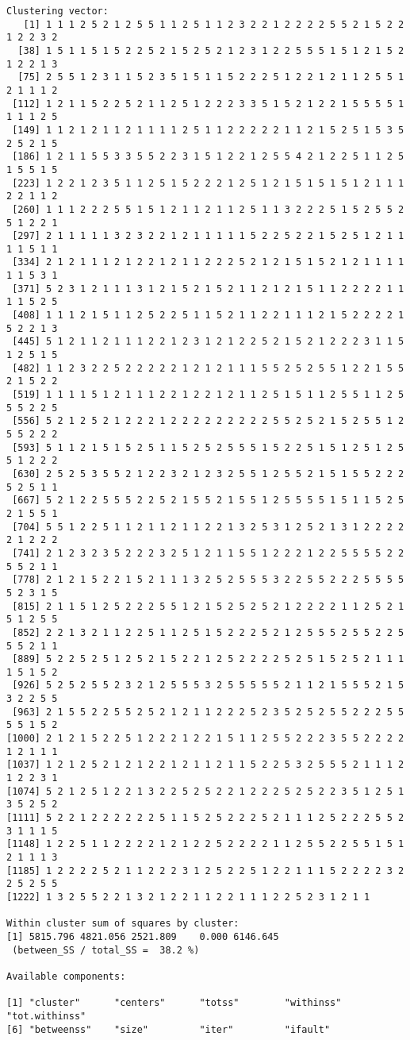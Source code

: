 \documentclass[
  letterpaper,
  DIV=11,
  numbers=noendperiod]{scrartcl}
\begin{document}
\begin{verbatim}
Clustering vector:
   [1] 1 1 1 2 5 2 1 2 5 5 1 1 2 5 1 1 2 3 2 2 1 2 2 2 2 5 5 2 1 5 2 2 1 2 2 3 2
  [38] 1 5 1 1 5 1 5 2 2 5 2 1 5 2 5 2 1 2 3 1 2 2 5 5 5 1 5 1 2 1 5 2 1 2 2 1 3
  [75] 2 5 5 1 2 3 1 1 5 2 3 5 1 5 1 1 5 2 2 2 5 1 2 2 1 2 1 1 2 5 5 1 2 1 1 1 2
 [112] 1 2 1 1 5 2 2 5 2 1 1 2 5 1 2 2 2 3 3 5 1 5 2 1 2 2 1 5 5 5 5 1 1 1 1 2 5
 [149] 1 1 2 1 2 1 1 2 1 1 1 1 2 5 1 1 2 2 2 2 2 1 1 2 1 5 2 5 1 5 3 5 2 5 2 1 5
 [186] 1 2 1 1 5 5 3 3 5 5 2 2 3 1 5 1 2 2 1 2 5 5 4 2 1 2 2 5 1 1 2 5 1 5 5 1 5
 [223] 1 2 2 1 2 3 5 1 1 2 5 1 5 2 2 2 1 2 5 1 2 1 5 1 5 1 5 1 2 1 1 1 2 2 1 1 2
 [260] 1 1 1 2 2 2 5 5 1 5 1 2 1 1 2 1 1 2 5 1 1 3 2 2 2 5 1 5 2 5 5 2 5 1 2 2 1
 [297] 2 1 1 1 1 1 3 2 3 2 2 1 2 1 1 1 1 1 5 2 2 5 2 2 1 5 2 5 1 2 1 1 1 1 5 1 1
 [334] 2 1 2 1 1 1 2 1 2 2 1 2 1 1 2 2 2 5 2 1 2 1 5 1 5 2 1 2 1 1 1 1 1 1 5 3 1
 [371] 5 2 3 1 2 1 1 1 3 1 2 1 5 2 1 5 2 1 1 2 1 2 1 5 1 1 2 2 2 2 1 1 1 1 5 2 5
 [408] 1 1 1 2 1 5 1 1 2 5 2 2 5 1 1 5 2 1 1 2 2 1 1 1 2 1 5 2 2 2 2 1 5 2 2 1 3
 [445] 5 1 2 1 1 2 1 1 1 2 2 1 2 3 1 2 1 2 2 5 2 1 5 2 1 2 2 2 3 1 1 5 1 2 5 1 5
 [482] 1 1 2 3 2 2 5 2 2 2 2 2 1 2 1 2 1 1 1 5 5 2 5 2 5 5 1 2 2 1 5 5 2 1 5 2 2
 [519] 1 1 1 1 5 1 2 1 1 1 2 2 1 2 2 1 2 1 1 2 5 1 5 1 1 2 5 5 1 1 2 5 5 5 2 2 5
 [556] 5 2 1 2 5 2 1 2 2 2 1 2 2 2 2 2 2 2 2 2 5 5 2 5 2 1 5 2 5 5 1 2 5 5 2 2 2
 [593] 5 1 1 2 1 5 1 5 2 5 1 1 5 2 5 2 5 5 5 1 5 2 2 5 1 5 1 2 5 1 2 5 5 1 2 2 2
 [630] 2 5 2 5 3 5 5 2 1 2 2 3 2 1 2 3 2 5 5 1 2 5 5 2 1 5 1 5 5 2 2 2 5 2 5 1 1
 [667] 5 2 1 2 2 5 5 5 2 2 5 2 1 5 5 2 1 5 5 1 2 5 5 5 5 1 5 1 1 5 2 5 2 1 5 5 1
 [704] 5 5 1 2 2 5 1 1 2 1 1 2 1 1 2 2 1 3 2 5 3 1 2 5 2 1 3 1 2 2 2 2 2 1 2 2 2
 [741] 2 1 2 3 2 3 5 2 2 2 3 2 5 1 2 1 1 5 5 1 2 2 2 1 2 2 5 5 5 5 2 2 5 5 2 1 1
 [778] 2 1 2 1 5 2 2 1 5 2 1 1 1 3 2 5 2 5 5 5 3 2 2 5 5 2 2 2 5 5 5 5 5 2 3 1 5
 [815] 2 1 1 5 1 2 5 2 2 2 5 5 1 2 1 5 2 5 2 5 2 1 2 2 2 2 1 1 2 5 2 1 5 1 2 5 5
 [852] 2 2 1 3 2 1 1 2 2 5 1 1 2 5 1 5 2 2 2 5 2 1 2 5 5 5 2 5 5 2 2 5 5 5 2 1 1
 [889] 5 2 2 5 2 5 1 2 5 2 1 5 2 2 1 2 5 2 2 2 2 5 2 5 1 5 2 5 2 1 1 1 1 5 1 5 2
 [926] 5 2 5 2 5 5 2 3 2 1 2 5 5 5 3 2 5 5 5 5 5 2 1 1 2 1 5 5 5 2 1 5 3 2 2 5 5
 [963] 2 1 5 5 2 2 5 5 2 5 2 1 2 1 1 2 2 2 5 2 3 5 2 5 2 5 5 2 2 2 5 5 5 5 1 5 2
[1000] 2 1 2 1 5 2 2 5 1 2 2 2 1 2 2 1 5 1 1 2 5 5 2 2 2 3 5 5 2 2 2 2 1 2 1 1 1
[1037] 1 2 1 2 5 2 1 2 1 2 2 1 2 1 1 2 1 1 5 2 2 5 3 2 5 5 5 2 1 1 1 2 1 2 2 3 1
[1074] 5 2 1 2 5 1 2 2 1 3 2 2 5 2 5 2 2 1 2 2 2 5 2 5 2 2 3 5 1 2 5 1 3 5 2 5 2
[1111] 5 2 2 1 2 2 2 2 2 2 5 1 1 5 2 5 2 2 2 5 2 1 1 1 2 5 2 2 2 5 5 2 3 1 1 1 5
[1148] 1 2 2 5 1 1 2 2 2 2 1 2 1 2 2 5 2 2 2 2 1 1 2 5 5 2 2 5 5 1 5 1 2 1 1 1 3
[1185] 1 2 2 2 2 5 2 1 1 2 2 2 3 1 2 5 2 2 5 1 2 2 1 1 1 5 2 2 2 2 3 2 2 5 2 5 5
[1222] 1 3 2 5 5 2 2 1 3 2 1 2 2 1 1 2 2 1 1 1 2 2 5 2 3 1 2 1 1

Within cluster sum of squares by cluster:
[1] 5815.796 4821.056 2521.809    0.000 6146.645
 (between_SS / total_SS =  38.2 %)

Available components:

[1] "cluster"      "centers"      "totss"        "withinss"     "tot.withinss"
[6] "betweenss"    "size"         "iter"         "ifault"      
\end{verbatim}
\end{document}
